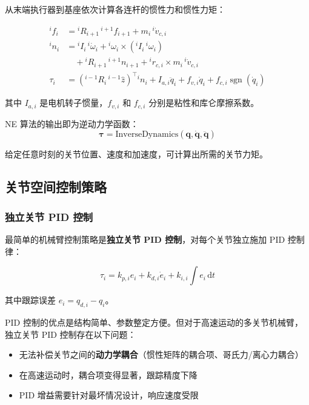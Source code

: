 \documentclass[12pt,a4paper,oneside]{article}
\numberwithin{equation}{section}
\DeclareMathOperator{\sgn}{sgn}
\newcommand{\dd}[1]{\mathrm{d}{#1}}
\newcommand{\bb}[1]{\mathbf{#1}}
\begin{document}
从末端执行器到基座依次计算各连杆的惯性力和惯性力矩：

\begin{align}
    {}^{i}f_i &= {}^{i}R_{i+1} \, {}^{i+1}f_{i+1} + m_i \, {}^{i}\dot{v}_{c,i} \\
    {}^{i}n_i &= {}^{i}I_i \, {}^{i}\dot{\omega}_i + {}^{i}\omega_i \times \left({}^{i}I_i \, {}^{i}\omega_i\right) \nonumber \\
              &\quad + {}^{i}R_{i+1} \, {}^{i+1}n_{i+1} + {}^{i}r_{c,i} \times m_i \, {}^{i}\dot{v}_{c,i} \\
    \tau_i &= \left({}^{i-1}R_i \, {}^{i-1}\hat{z}\right)^{\top} {}^{i}n_i + I_{a,i}\ddot{q}_i + f_{v,i}\dot{q}_i + f_{c,i}\sgn(\dot{q}_i)
\end{align}

其中 $I_{a,i}$ 是电机转子惯量，$f_{v,i}$ 和 $f_{c,i}$ 分别是粘性和库仑摩擦系数。

NE 算法的输出即为逆动力学函数：
\begin{equation}
    \bb{\tau} = \text{InverseDynamics}(\bb{q}, \dot{\bb{q}}, \ddot{\bb{q}})
    \label{eq:inverse_dynamics}
\end{equation}

给定任意时刻的关节位置、速度和加速度，可计算出所需的关节力矩。

\subsection{关节空间控制策略}

\subsubsection{独立关节 PID 控制}

最简单的机械臂控制策略是\textbf{独立关节 PID 控制}，对每个关节独立施加 PID 控制律：

\begin{equation}
    \tau_i = k_{p,i} e_i + k_{d,i} \dot{e}_i + k_{i,i} \int e_i \, \dd{t}
    \label{eq:pid_control}
\end{equation}

其中跟踪误差 $e_i = q_{d,i} - q_i$。

PID 控制的优点是结构简单、参数整定方便。但对于高速运动的多关节机械臂，
独立关节 PID 控制存在以下问题：
\begin{itemize}
    \item 无法补偿关节之间的\textbf{动力学耦合}（惯性矩阵的耦合项、哥氏力/离心力耦合）
    \item 在高速运动时，耦合项变得显著，跟踪精度下降
    \item PID 增益需要针对最坏情况设计，响应速度受限
\end{itemize}
\end{document}
